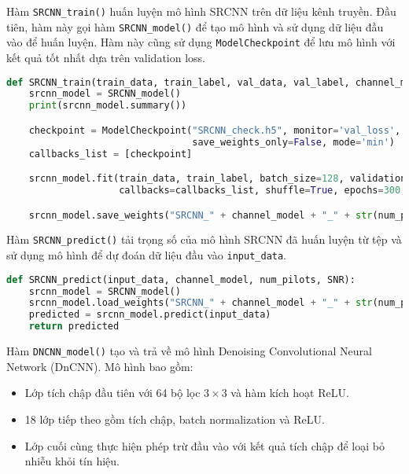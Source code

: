 Hàm \verb|SRCNN_train()| huấn luyện mô hình SRCNN trên dữ liệu kênh truyền. 
Đầu tiên, hàm này gọi hàm \verb|SRCNN_model()| để tạo mô hình và sử dụng dữ liệu đầu vào để huấn luyện. 
Hàm này cũng sử dụng \verb|ModelCheckpoint| để lưu mô hình với kết quả tốt nhất dựa trên validation loss.

\begin{lstlisting}[language=Python]
def SRCNN_train(train_data, train_label, val_data, val_label, channel_model, num_pilots, SNR):
    srcnn_model = SRCNN_model()
    print(srcnn_model.summary())

    checkpoint = ModelCheckpoint("SRCNN_check.h5", monitor='val_loss', verbose=1, save_best_only=True,
                                 save_weights_only=False, mode='min')
    callbacks_list = [checkpoint]

    srcnn_model.fit(train_data, train_label, batch_size=128, validation_data=(val_data, val_label),
                    callbacks=callbacks_list, shuffle=True, epochs=300, verbose=0)

    srcnn_model.save_weights("SRCNN_" + channel_model + "_" + str(num_pilots) + "_" + str(SNR) + ".h5")
\end{lstlisting}

Hàm \verb|SRCNN_predict()| tải trọng số của mô hình SRCNN đã huấn luyện từ tệp và sử dụng mô hình để dự đoán dữ liệu đầu vào \verb|input_data|.

\begin{lstlisting}[language=Python]
def SRCNN_predict(input_data, channel_model, num_pilots, SNR):
    srcnn_model = SRCNN_model()
    srcnn_model.load_weights("SRCNN_" + channel_model + "_" + str(num_pilots) + "_" + str(SNR) + ".h5")
    predicted = srcnn_model.predict(input_data)
    return predicted
\end{lstlisting}

Hàm \verb|DNCNN_model()| tạo và trả về mô hình Denoising Convolutional Neural Network (DnCNN). 
Mô hình bao gồm:
\begin{itemize}
    \item Lớp tích chập đầu tiên với 64 bộ lọc $3 \times 3$ và hàm kích hoạt ReLU.
    \item 18 lớp tiếp theo gồm tích chập, batch normalization và ReLU.
    \item Lớp cuối cùng thực hiện phép trừ đầu vào với kết quả tích chập để loại bỏ nhiễu khỏi tín hiệu.
\end{itemize}

